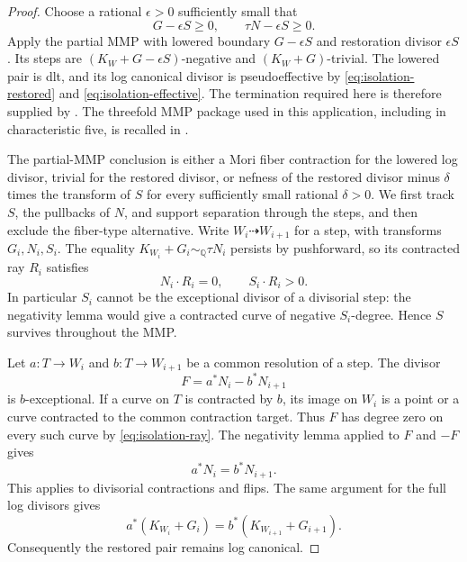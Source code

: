 \begin{proof}
Choose a rational $\epsilon>0$ sufficiently small that
\begin{equation}\label{eq:isolation-effective}
  G-\epsilon S\geq0,\qquad \tau N-\epsilon S\geq0.
\end{equation}
Apply the partial MMP with lowered boundary $G-\epsilon S$ and
restoration divisor $\epsilon S$
\cite[Proposition~2.21, Definition~2.23, and Lemma~2.24]{XuNuTwo}.
Its steps are $(K_W+G-\epsilon S)$-negative and $(K_W+G)$-trivial.
The lowered pair is dlt, and its log canonical divisor is
pseudoeffective by \eqref{eq:isolation-restored} and
\eqref{eq:isolation-effective}.  The termination required here is
therefore supplied by \cite[Theorem~1.5]{XuNonvanishing}.
The threefold MMP package used in this application, including in
characteristic five, is recalled in \cite[Section~2.3]{Companion}.

The partial-MMP conclusion is either a Mori fiber contraction for the
lowered log divisor, trivial for the restored divisor, or nefness of the
restored divisor minus $\delta$ times the transform of $S$ for every
sufficiently small rational $\delta>0$. We first track $S$, the pullbacks
of $N$, and support separation through the steps, and then exclude the
fiber-type alternative. Write $W_i\dashrightarrow W_{i+1}$
for a step, with transforms $G_i,N_i,S_i$.  The equality
$K_{W_i}+G_i\sim_{\mathbb Q}\tau N_i$ persists by pushforward, so its
contracted ray $R_i$ satisfies
\begin{equation}\label{eq:isolation-ray}
  N_i\cdot R_i=0,\qquad S_i\cdot R_i>0.
\end{equation}
In particular $S_i$ cannot be the exceptional divisor of a divisorial
step: the negativity lemma would give a contracted curve of negative
$S_i$-degree.  Hence $S$ survives throughout the MMP.

Let $a:T\to W_i$ and $b:T\to W_{i+1}$ be a common resolution of a
step.  The divisor
\[
  F=a^*N_i-b^*N_{i+1}
\]
is $b$-exceptional.  If a curve on $T$ is contracted by $b$, its image
on $W_i$ is a point or a curve contracted to the common contraction
target.  Thus $F$ has degree zero on every such curve by
\eqref{eq:isolation-ray}.  The negativity lemma applied to $F$ and
$-F$ gives
\begin{equation}\label{eq:isolation-step-pullback}
  a^*N_i=b^*N_{i+1}.
\end{equation}
This applies to divisorial contractions and flips.  The same argument
for the full log divisors gives
\[
  a^*(K_{W_i}+G_i)=b^*(K_{W_{i+1}}+G_{i+1}).
\]
Consequently the restored pair remains log canonical.


\end{proof}
